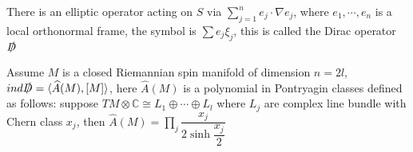 \documentclass[../main.tex]{subfiles}
\begin{document}
\begin{definition}
There is an elliptic operator acting on $S$ via $\displaystyle\sum_{j=1}^ne_j\cdot\nabla e_j$, where $e_1,\cdots,e_n$ is a local orthonormal frame, the symbol is $\sum e_j\xi_j$, this is called the Dirac operator $\slashed{D}$
\end{definition}

\begin{theorem}
Assume $M$ is a closed Riemannian spin manifold of dimension $n=2l$, $ind\slashed{D}=\langle \widehat{A}(M),[M]\rangle$, here $\widehat{A}(M)$ is a polynomial in Pontryagin classes defined as follows: suppose $TM\otimes\mathbb C\cong L_1\oplus\cdots\oplus L_l$ where $L_j$ are complex line bundle with Chern class $x_j$, then $\widehat{A}(M)=\displaystyle\prod_{j}\dfrac{x_j}{2\sinh\dfrac{x_j}{2}}$
\end{theorem}
\end{document}
